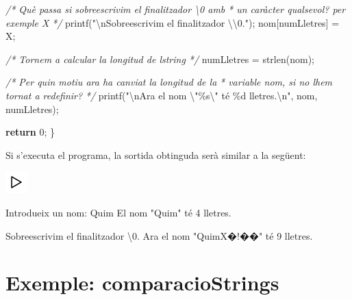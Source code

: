 \documentclass[]{book}
\newenvironment{Shaded}{\begin{snugshade}}{\end{snugshade}}
\newcommand{\CharTok}[1]{\textcolor[rgb]{0.31,0.60,0.02}{#1}}
\newcommand{\CommentTok}[1]{\textcolor[rgb]{0.56,0.35,0.01}{\textit{#1}}}
\newcommand{\ControlFlowTok}[1]{\textcolor[rgb]{0.13,0.29,0.53}{\textbf{#1}}}
\newcommand{\DecValTok}[1]{\textcolor[rgb]{0.00,0.00,0.81}{#1}}
\newcommand{\NormalTok}[1]{#1}
\newcommand{\SpecialCharTok}[1]{\textcolor[rgb]{0.00,0.00,0.00}{#1}}
\newcommand{\StringTok}[1]{\textcolor[rgb]{0.31,0.60,0.02}{#1}}
\begin{document}
\begin{Shaded}
\begin{Highlighting}[]
    \CommentTok{/* Què passa si sobreescrivim el finalitzador \textquotesingle{}\textbackslash{}0\textquotesingle{} amb}
\CommentTok{     * un caràcter qualsevol? per exemple \textquotesingle{}X\textquotesingle{}}
\CommentTok{     */}
\NormalTok{    printf(}\StringTok{"}\SpecialCharTok{\textbackslash{}n}\StringTok{Sobreescrivim el finalitzador \textquotesingle{}}\SpecialCharTok{\textbackslash{}\textbackslash{}}\StringTok{0\textquotesingle{}."}\NormalTok{);}
\NormalTok{    nom[numLletres] = }\CharTok{\textquotesingle{}X\textquotesingle{}}\NormalTok{;}

    \CommentTok{/* Tornem a calcular la longitud de l\textquotesingle{}string */}
\NormalTok{    numLletres = strlen(nom);}

    \CommentTok{/* Per quin motiu ara ha canviat la longitud de la}
\CommentTok{     * variable nom, si no l\textquotesingle{}hem tornat a redefinir?}
\CommentTok{     */}
\NormalTok{    printf(}\StringTok{"}\SpecialCharTok{\textbackslash{}n}\StringTok{Ara el nom }\SpecialCharTok{\textbackslash{}"}\StringTok{\%s}\SpecialCharTok{\textbackslash{}"}\StringTok{ té \%d lletres.}\SpecialCharTok{\textbackslash{}n}\StringTok{"}\NormalTok{, nom, numLletres);}

    \ControlFlowTok{return} \DecValTok{0}\NormalTok{;}
\NormalTok{\}}
\end{Highlighting}
\end{Shaded}

Si s'executa el programa, la sortida obtinguda serà similar a la següent:

\includegraphics{./img/play.png}

\begin{Shaded}
\begin{Highlighting}[]
\NormalTok{Introdueix un nom: Quim}
\NormalTok{El nom }\StringTok{"Quim"}\NormalTok{ té }\DecValTok{4}\NormalTok{ lletres.}

\NormalTok{Sobreescrivim el finalitzador }\CharTok{\textquotesingle{}\textbackslash{}0\textquotesingle{}}\NormalTok{.}
\NormalTok{Ara el nom }\StringTok{"QuimX�!��"}\NormalTok{ té }\DecValTok{9}\NormalTok{ lletres.}
\end{Highlighting}
\end{Shaded}

\hypertarget{exemple-comparaciostrings}{%
\section{Exemple: comparacioStrings}\label{exemple-comparaciostrings}}
\end{document}
